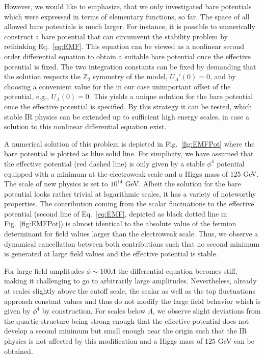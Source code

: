 \documentclass[twocolumn,aps,prd,showpacs,nofootinbib,superscriptaddress,preprintnumbers,floatfix,10pt]{revtex4-1}
\newcommand{\UL}{U_{\Lambda}}
\begin{document}
However, we would like to emphasize, that we only investigated bare potentials which were expressed in terms of elementary functions, so far. 
The space of all allowed bare potentials is much larger. For instance, it is possible to numerically construct a bare potential that can circumvent the stability problem by rethinking Eq.~\eqref{eq:EMF}. 
This equation can be viewed as a nonlinear second order differential equation to obtain a suitable bare potential once the effective potential is fixed. The two integration constants can be fixed by demanding that the solution respects the $\mathbb{Z}_{2}$ symmetry of the model, $\UL'(0)=0$, and by choosing a convenient value for the in our case unimportant offset of the potential, e.g., $\UL(0) = 0$. 
This yields a unique solution for the bare potential once the effective potential is specified.  By this strategy it can be tested, which stable IR physics can be extended up to sufficient high energy scales, in case a solution to this nonlinear differential equation exist. 


A numerical solution of this problem is depicted in Fig.~\ref{fig:EMFPot} where the bare potential is plotted as blue solid line. For simplicity, we have assumed that the effective potential (red dashed line) is only given by a stable $\phi^{4}$ potential equipped with a minimum at the electroweak scale and a Higgs mass of $125$ GeV. The scale of new physics is set to $10^{14}$ GeV. Albeit the solution for the bare potential looks rather trivial at logarithmic scales, it has a variety of noteworthy properties. 
The contribution coming from the scalar fluctuations to the effective potential (second line of Eq.~\eqref{eq:EMF}, depicted as black dotted line in Fig.~\ref{fig:EMFPot}) is almost identical to the absolute value of the fermion determinant for field values larger than the electroweak scale. Thus, we observe a dynamical cancellation between both contributions such that no second minimum is generated at large field values and the effective potential is stable. 


For large field amplitudes $\phi \sim 100 \Lambda$ the differential equation becomes stiff, making it challenging to go to arbitrarily large amplitudes. Nevertheless, already at scales slightly above the cutoff scale, the scalar as well as the top fluctuations approach constant values and thus do not modify the large field behavior which is given by $\phi^{4}$ by construction. For scales below $\Lambda$, we observe slight deviations from the quartic structure being strong enough that the effective potential does not develop a second minimum but small enough near the origin such that the IR physics is not affected by this modification and a Higgs mass of $125$ GeV can be obtained. 
\end{document}
